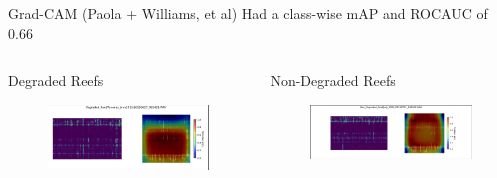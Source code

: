 \begin{frame}{Grad-CAM (Paola + Williams, et al)}
   Had a class-wise mAP and ROCAUC of 0.66
    \begin{columns}
        \begin{column}{0.33\textwidth}
            Degraded Reefs
            \begin{figure}
                \centering
                \includegraphics[width=\linewidth,keepaspectratio]{images/Degraded_grad_cam_et_all.png}
            \end{figure}
        \end{column}
        
        \begin{column}{0.33\textwidth}
            Non-Degraded Reefs
            \begin{figure}
                \centering
                \includegraphics[width=\linewidth,keepaspectratio]{images/Non_degraded_grad_cam_et_all.png}
            \end{figure}
        \end{column}
        

\end{columns}
\end{frame}

